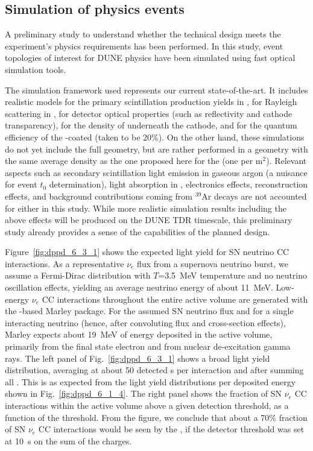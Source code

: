 \subsection{Simulation of physics events}
\label{sec:fddp-pd-6.3}

A preliminary study to understand whether the \dual {} technical design meets the experiment's physics requirements has been performed. In this study, event topologies of interest for DUNE physics have been simulated using \larsoft fast optical simulation tools.

The simulation framework used represents our current state-of-the-art. It includes realistic models for the primary scintillation production yields in \lar, for Rayleigh scattering in \lar, for detector optical properties (such as  reflectivity and cathode transparency), for the density of  underneath the cathode, and for the quantum efficiency of the -coated  (taken to be \num{20}\%). On the other hand, these simulations do not yet include the full  geometry, but are rather performed in a  geometry with the same average  density as the one proposed here for the  (one  per m$^2$). Relevant aspects such as secondary scintillation light emission in gaseous argon (a nuisance for event $t_0$ determination), light absorption in \lar, electronics effects, reconstruction effects, and background contributions coming from $^{39}$Ar decays are not accounted for either in this study. While more realistic simulation results including the above effects will be produced on the DUNE TDR timescale, this preliminary study already provides a sense of the capabilities of the planned  design.

Figure~\ref{fig:dppd_6_3_1} shows the expected light yield for SN neutrino CC interactions. As a representative $\nu_e$ flux from a supernova neutrino burst, we assume a Fermi-Dirac distribution with $T$=\SI{3.5}{\MeV} temperature and no neutrino oscillation effects, yielding an average neutrino energy of about 11~MeV. Low-energy $\nu_e$ CC interactions throughout the entire \lartpc active volume are generated with the \larsoft-based Marley package. For the assumed SN neutrino flux and for a single interacting neutrino (hence, after convoluting flux and cross-section effects), Marley expects about \SI{19}{\MeV} of energy deposited in the \lar active volume, primarily from the final state electron and from nuclear de-excitation gamma rays. The left panel of Fig.~\ref{fig:dppd_6_3_1} shows a broad light yield distribution, averaging at about \num{50} detected \phel{}s per interaction and after summing all . This is as expected from the light yield distributions per deposited energy shown in Fig.~\ref{fig:dppd_6_1_4}. The right panel shows the fraction of SN $\nu_e$ CC interactions within the \lartpc active volume above a given \phel detection threshold, as a function of the \phel threshold. From the figure, we conclude that about a 70\% fraction of SN $\nu_e$ CC interactions would be seen by the , if the detector threshold was set at \num{10}~\phel{}s on the sum of the  charges.

